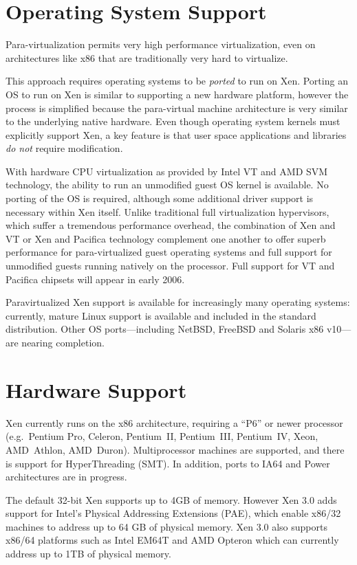 \documentclass[11pt,twoside,final,openright]{report}
\begin{document}
\section{Operating System Support}

Para-virtualization permits very high performance virtualization, even
on architectures like x86 that are traditionally very hard to
virtualize.

This approach requires operating systems to be \emph{ported} to run on
Xen. Porting an OS to run on Xen is similar to supporting a new
hardware platform, however the process is simplified because the
para-virtual machine architecture is very similar to the underlying
native hardware. Even though operating system kernels must explicitly
support Xen, a key feature is that user space applications and
libraries \emph{do not} require modification.

With hardware CPU virtualization as provided by Intel VT and AMD
SVM technology, the ability to run an unmodified guest OS kernel
is available.  No porting of the OS is required, although some
additional driver support is necessary within Xen itself.  Unlike
traditional full virtualization hypervisors, which suffer a tremendous
performance overhead, the combination of Xen and VT or Xen and
Pacifica technology complement one another to offer superb performance
for para-virtualized guest operating systems and full support for
unmodified guests running natively on the processor.  Full support for
VT and Pacifica chipsets will appear in early 2006.

Paravirtualized Xen support is available for increasingly many
operating systems: currently, mature Linux support is available and
included in the standard distribution.  Other OS ports---including
NetBSD, FreeBSD and Solaris x86 v10---are nearing completion. 


\section{Hardware Support}

Xen currently runs on the x86 architecture, requiring a ``P6'' or
newer processor (e.g.\ Pentium Pro, Celeron, Pentium~II, Pentium~III,
Pentium~IV, Xeon, AMD~Athlon, AMD~Duron). Multiprocessor machines are
supported, and there is support for HyperThreading (SMT).  In 
addition, ports to IA64 and Power architectures are in progress.

The default 32-bit Xen supports up to 4GB of memory. However Xen 3.0
adds support for Intel's Physical Addressing Extensions (PAE), which
enable x86/32 machines to address up to 64 GB of physical memory.  Xen
3.0 also supports x86/64 platforms such as Intel EM64T and AMD Opteron
which can currently address up to 1TB of physical memory.
\end{document}
